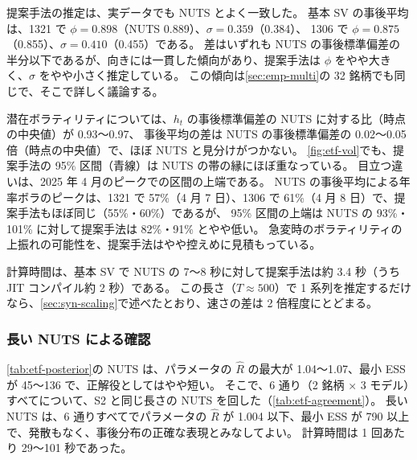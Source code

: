 提案手法の推定は、実データでも NUTS とよく一致した。
基本 SV の事後平均は、1321 で $\phi = 0.898$（NUTS 0.889）、$\sigma = 0.359$（0.384）、
1306 で $\phi = 0.875$（0.855）、$\sigma = 0.410$（0.455）である。
差はいずれも NUTS の事後標準偏差の半分以下であるが、向きには一貫した傾向があり、提案手法は $\phi$ をやや大きく、$\sigma$ をやや小さく推定している。
この傾向は\cref{sec:emp-multi}の 32 銘柄でも同じで、そこで詳しく議論する。

潜在ボラティリティについては、$h_t$ の事後標準偏差の NUTS に対する比（時点の中央値）が 0.93〜0.97、
事後平均の差は NUTS の事後標準偏差の 0.02〜0.05 倍（時点の中央値）で、ほぼ NUTS と見分けがつかない。
\cref{fig:etf-vol}でも、提案手法の 95\% 区間（青線）は NUTS の帯の縁にほぼ重なっている。
目立つ違いは、2025 年 4 月のピークでの区間の上端である。
NUTS の事後平均による年率ボラのピークは、1321 で 57\%（4 月 7 日）、1306 で 61\%（4 月 8 日）で、提案手法もほぼ同じ（55\%・60\%）であるが、
95\% 区間の上端は NUTS の 93\%・101\% に対して提案手法は 82\%・91\% とやや低い。
急変時のボラティリティの上振れの可能性を、提案手法はやや控えめに見積もっている。

計算時間は、基本 SV で NUTS の 7〜8 秒に対して提案手法は約 3.4 秒（うち JIT コンパイル約 2 秒）である。
この長さ（$T \approx 500$）で 1 系列を推定するだけなら、\cref{sec:syn-scaling}で述べたとおり、速さの差は 2 倍程度にとどまる。

\subsubsection{長い NUTS による確認}

\begin{table}[tbp]
  \centering
  \caption{長い NUTS（4 連鎖、ウォームアップ 2,000 回の後 32,000 回を 8 つおきに保存）を基準にした一致度。
    「基準化した平均差」は（事後平均 $-$ 長い NUTS の事後平均）/ 長い NUTS の事後標準偏差、sd 比は長い NUTS に対する事後標準偏差の比（$h$ は時点の中央値）。
    右の 2 列は、\cref{tab:etf-posterior}の標準の長さの NUTS の、パラメータの基準化した平均差の絶対値の最大と、$h$ の sd 比。}
  \label{tab:etf-agreement}
  \small
  \setlength{\tabcolsep}{3.5pt}
  
\end{table}

\cref{tab:etf-posterior}の NUTS は、パラメータの $\hat R$ の最大が 1.04〜1.07、最小 ESS が 45〜136 で、正解役としてはやや短い。
そこで、6 通り（2 銘柄 × 3 モデル）すべてについて、S2 と同じ長さの NUTS を回した（\cref{tab:etf-agreement}）。
長い NUTS は、6 通りすべてでパラメータの $\hat R$ が 1.004 以下、最小 ESS が 790 以上で、発散もなく、事後分布の正確な表現とみなしてよい。
計算時間は 1 回あたり 29〜101 秒であった。

